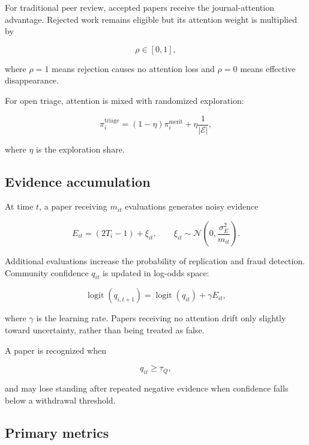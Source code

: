 \documentclass[11pt]{article}
\begin{document}
For traditional peer review, accepted papers receive the journal-attention advantage. Rejected work remains eligible but its attention weight is multiplied by

\begin{equation}
\rho\in[0,1],
\end{equation}

where $\rho=1$ means rejection causes no attention loss and $\rho=0$ means effective disappearance.

For open triage, attention is mixed with randomized exploration:

\begin{equation}
\pi_i^{\mathrm{triage}}
=(1-\eta)\pi_i^{\mathrm{merit}}
+\eta\frac{1}{|\mathcal{E}|},
\end{equation}

where $\eta$ is the exploration share.

\subsection{Evidence accumulation}

At time $t$, a paper receiving $m_{it}$ evaluations generates noisy evidence

\begin{equation}
E_{it}=(2T_i-1)+\xi_{it},
\qquad
\xi_{it}\sim\mathcal{N}\left(0,\frac{\sigma_E^2}{m_{it}}\right).
\end{equation}

Additional evaluations increase the probability of replication and fraud detection. Community confidence $q_{it}$ is updated in log-odds space:

\begin{equation}
\operatorname{logit}(q_{i,t+1})
=
\operatorname{logit}(q_{it})+\gamma E_{it},
\end{equation}

where $\gamma$ is the learning rate. Papers receiving no attention drift only slightly toward uncertainty, rather than being treated as false.

A paper is recognized when

\begin{equation}
q_{it}\geq \tau_Q,
\end{equation}

and may lose standing after repeated negative evidence when confidence falls below a withdrawal threshold.

\subsection{Primary metrics}
\end{document}
